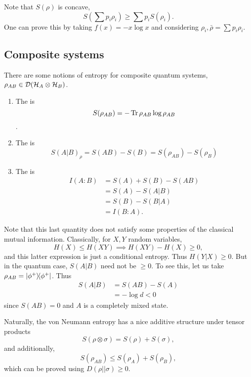 Note that $S(\rho)$ is concave,
\begin{equation}
    S(\sum p_i \rho_i)\geq \sum p_i S(\rho_i).
\end{equation}
One can prove this by taking $f(x)=-x\log x$ and considering $\rho_i, \bar \rho=\sum p_i \rho_i$.

\subsection*{Composite systems}
There are some notions of entropy for composite quantum systems, $\rho_{AB}\in \mathcal{D}(\mathcal H_A \otimes \mathcal H_B)$.
\begin{enumerate}
    \item The  is 
    \begin{equation}
        S(\rho_{AB})=-\operatorname{Tr} \rho_{AB}\log \rho_{AB}
    \end{equation}.
    \item The  is
    \begin{equation}
        S(A|B)_\rho=S(AB)-S(B) =S(\rho_{AB})-S(\rho_B)
    \end{equation}
    \item The  is
    \begin{align*}
        I(A:B) &=S(A)+S(B)-S(AB)\\
        &=S(A)-S(A|B)\\
        &= S(B)- S(B|A)\\
        &= I(B:A).
    \end{align*}
\end{enumerate}
Note that this last quantity does not satisfy some properties of the classical mutual information. Classically, for $X,Y$ random variables,
\begin{equation}
    H(X) \leq H(XY) \implies H(XY)-H(X) \geq 0,
\end{equation}
and this latter expression is just a conditional entropy. Thus $H(Y|X)\geq 0$. But in the quantum case, $S(A|B)$ need not be $\geq 0$. To see this, let us take $\rho_{AB}=\left\lvert{\phi^+}\middle\rangle\!\middle\langle{\phi^+}\right\rvert$. Thus
\begin{align*}
    S(A|B) &= S(AB) - S(A)\\
        &= -\log d <0
\end{align*}
since $S(AB)=0$ and $A$ is a completely mixed state.

Naturally, the von Neumann entropy has a nice additive structure under tensor products
\begin{equation}
    S(\rho\otimes \sigma)= S(\rho)+S(\sigma),
\end{equation}
and additionally,
\begin{equation}
    S(\rho_{AB})\leq S(\rho_A) +S(\rho_B),
\end{equation}
which can be proved using $D(\rho||\sigma)\geq 0$.